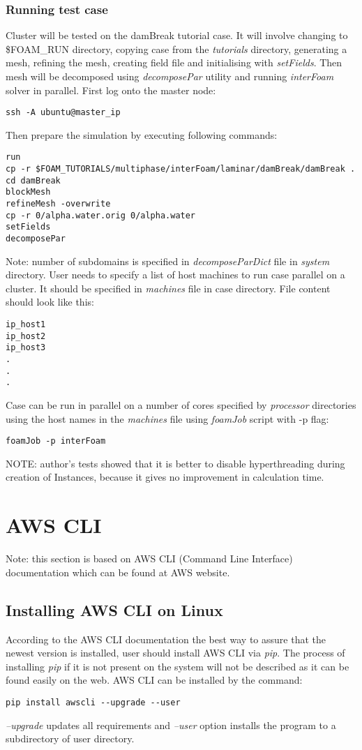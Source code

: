 \documentclass[11pt,english]{article}
\begin{document}
\subsubsection{Running test case}
Cluster will be tested on the damBreak tutorial case. It will involve changing to \$FOAM\_RUN directory, copying case from the \textit{tutorials} directory, generating a mesh, refining the mesh, creating field file and initialising with \textit{setFields}. Then mesh will be decomposed using \textit{decomposePar} utility and running \textit{interFoam} solver in parallel.
First log onto the master node:
\begin{lstlisting}
ssh -A ubuntu@master_ip
\end{lstlisting}
Then prepare the simulation by executing following commands:
\begin{lstlisting}
run
cp -r $FOAM_TUTORIALS/multiphase/interFoam/laminar/damBreak/damBreak .
cd damBreak
blockMesh
refineMesh -overwrite
cp -r 0/alpha.water.orig 0/alpha.water
setFields
decomposePar
\end{lstlisting}
Note: number of subdomains is specified in \textit{decomposeParDict} file in \textit{system} directory.
User needs to specify a list of host machines to run case parallel on a cluster. It should be specified in \textit{machines} file in case directory. File content should look like this:
\begin{lstlisting}
ip_host1
ip_host2
ip_host3
.
.
.
\end{lstlisting}
Case can be run in parallel on a number of cores specified by \textit{processor} directories using the host names in the \textit{machines} file using \textit{foamJob} script with -p flag:
\begin{lstlisting}
foamJob -p interFoam
\end{lstlisting}

NOTE: author's tests showed that it is  better to disable hyperthreading during creation of Instances, because it gives no improvement in calculation time.

\section{AWS CLI}
Note: this section is based on AWS CLI (Command Line Interface) documentation which can be found at AWS website.
\subsection{\label{Install AWS CLI}Installing AWS CLI on Linux}
According to the AWS CLI documentation the best way to assure that the newest version is installed, user should install AWS CLI via \textit{pip}. The process of installing \textit{pip} if it is not present on the system will not be described as it can be found easily on the web.
AWS CLI can be installed by the command:
\begin{lstlisting}	
pip install awscli --upgrade --user
\end{lstlisting}
\textit{--upgrade} updates all requirements and \textit{--user} option installs the program to a subdirectory of user directory.
\end{document}
